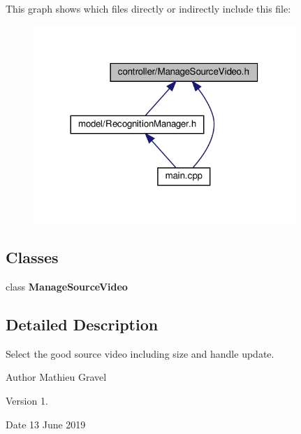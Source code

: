 This graph shows which files directly or indirectly include this file\+:
\nopagebreak
\begin{figure}[H]
\begin{center}
\leavevmode
\includegraphics[width=281pt]{_manage_source_video_8h__dep__incl}
\end{center}
\end{figure}
\subsection*{Classes}
\begin{DoxyCompactItemize}
\item 
class \textbf{ Manage\+Source\+Video}
\end{DoxyCompactItemize}


\subsection{Detailed Description}
Select the good source video including size and handle update. 

\begin{DoxyAuthor}{Author}
Mathieu Gravel 
\end{DoxyAuthor}
\begin{DoxyVersion}{Version}
1. 
\end{DoxyVersion}
\begin{DoxyDate}{Date}
13 June 2019 
\end{DoxyDate}
